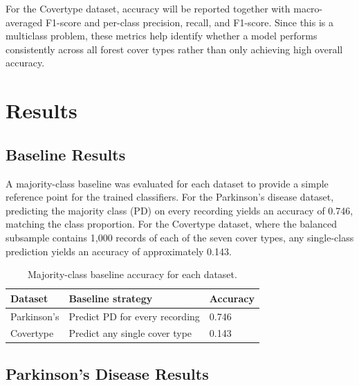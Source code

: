 \documentclass[11pt,a4paper]{article}
\begin{document}
For the Covertype dataset, accuracy will be reported together with
macro-averaged F1-score and per-class precision, recall, and F1-score. Since
this is a multiclass problem, these metrics help identify whether a model
performs consistently across all forest cover types rather than only achieving
high overall accuracy.

\section{Results}

\subsection{Baseline Results}\label{sec:baselines}


A majority-class baseline was evaluated for each dataset to provide a simple
reference point for the trained classifiers. For the Parkinson's disease
dataset, predicting the majority class (PD) on every recording yields an
accuracy of 0.746, matching the class proportion. For the Covertype dataset,
where the balanced subsample contains 1{,}000 records of each of the seven
cover types, any single-class prediction yields an accuracy of approximately
0.143.

\begin{table}[H]
    \centering
    \caption{Majority-class baseline accuracy for each dataset.}
    \label{tab:baseline}
    \begin{tabular}{lll}
        \toprule
        Dataset    & Baseline strategy        & Accuracy \\
        \midrule
        Parkinson's & Predict PD for every recording          & 0.746 \\
        Covertype   & Predict any single cover type           & 0.143 \\
        \bottomrule
    \end{tabular}
\end{table}

\subsection{Parkinson's Disease Results}
\end{document}
